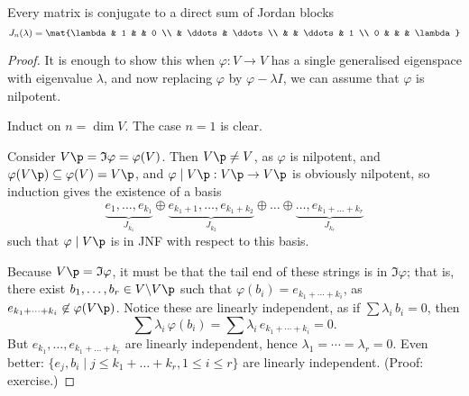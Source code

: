 
\begin{theorem}
	 Every matrix is conjugate to a direct sum of Jordan blocks %
	\begin{equation*}
		J_n(\lambda) = \mat{\lambda & 1 & & 0 \\
		& \ddots & \ddots \\
		& & \ddots & 1 \\
		0 & & & \lambda}
	\end{equation*}
\end{theorem}

\begin{proof}
	It is enough to show this when $\varphi:V\to V$ has a single generalised eigenspace with eigenvalue $\lambda$, and now replacing $\varphi$ by $\varphi-\lambda I$, we can assume that $\varphi$ is nilpotent. %
	
	Induct on $n=\dim V$. The case $n=1$ is clear. %
	
	\newcommand{\ooplus}{\underset{\underset{\underset{\bigoplus}}{}}{,}}
	
	Consider $V\p=\Im\varphi=\varphi(V)$. Then $V\p\neq V$, as $\varphi$ is nilpotent, and $\varphi(V\p)\subseteq \varphi(V) = V\p$, and $\varphi\mid V\p:V\p\to V\p$ is obviously nilpotent, so induction gives the existence of a basis %
	\begin{equation*}
		\underbrace{e_1,\ldots,e_{k_1}}_{J_{k_1}}
		\oplus
		\underbrace{e_{k_1+1},\ldots,e_{k_1+k_2}}_{J_{k_2}}
		\oplus
		\ldots
		\oplus
		\underbrace{\ldots,e_{k_1+\ldots+k_r}}_{J_{k_r}}
	\end{equation*}
	such that $\varphi\mid V\p$ is in JNF with respect to this basis.
	
		\pagebreak
	
	Because $V\p=\Im\varphi$, it must be that the tail end of these strings is in $\Im\varphi$; that is, there exist $b_1,\ldots,b_r\in V\backslash V\p$ such that $\varphi(b_i) = e_{k_1 + \cdots+ k_i}$, as $e_{k_1 + \cdots + k_i}\not\in\varphi(V\p)$. Notice these are linearly independent, as if $\sum \lambda_i \, b_i=0$, then %
	\begin{equation*}
		\sum \lambda_i \, \varphi(b_i) = \sum \lambda_i \, e_{k_1+\cdots+k_i} = 0.
	\end{equation*}
	But $e_{k_1},\ldots,e_{k_1+\ldots+k_r}$ are linearly independent, hence $\lambda_1=\cdots=\lambda_r=0$. Even better: $\{e_j,b_i \mid j\leq k_1+\ldots+k_r, 1\leq i\leq r\}$ are linearly independent. (Proof: exercise.) %
	

\end{proof}
